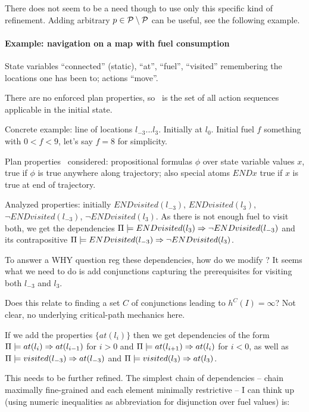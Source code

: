 There does not seem to be a need though to use only this specific kind
of refinement. Adding arbitrary $p \in \cal P \setminus P$
can be useful, see the following example.





\paragraph{Example: navigation on a map with fuel consumption}

State variables ``connected'' (static), ``at'', ``fuel'', ``visited''
remembering the locations one has been to; actions ``move''.

There are no enforced plan properties, so \plans\ is the set of all
action sequences applicable in the initial state.

Concrete example: line of locations $l_{-3} ... l_3$. Initially at
$l_0$. Initial fuel $f$ something with $0 < f < 9$, let's say $f = 8$
for simplicity.

Plan properties \candprops\ considered: propositional formulas $\phi$
over state variable values $x$, true if $\phi$ is true anywhere along
trajectory; also special atoms $END x$ true if $x$ is true at end of
trajectory.

Analyzed properties: initially $END visited(l_{-3})$, $END
visited(l_3)$, $\neg END visited(l_{-3})$, $\neg END visited(l_3)$. As
there is not enough fuel to visit both, we get the dependencies
$\Pi \models END visited(l_{3}) \Rightarrow \neg END visited(l_{-3})$ and
its contrapositive $\Pi \models END visited(l_{-3}) \Rightarrow \neg END
  visited(l_{3})$.

To answer a WHY question reg these dependencies, how do we modify
\props? It seems what we need to do is add conjunctions capturing the
prerequisites for visiting both $l_{-3}$ and $l_3$. 

Does this relate to finding a set $C$ of conjunctions leading to
$h^C(I) = \infty$? Not clear, no underlying critical-path mechanics
here.

If we add the properties $\{at(l_i)\}$ then we get dependencies of the
form $\Pi \models at(l_i) \Rightarrow at(l_{i-1})$ for $i > 0$ and
$\Pi \models at(l_{i+1}) \Rightarrow at(l_{i})$ for $i < 0$, as well as
$\Pi \models visited(l_{-3}) \Rightarrow at(l_{-3})$ and
$\Pi \models visited(l_{3}) \Rightarrow at(l_{3})$.

This needs to be further refined. The simplest chain of dependencies
-- chain maximally fine-grained and each element minimally restrictive
-- I can think up (using numeric inequalities as abbreviation for
disjunction over fuel values) is: 


